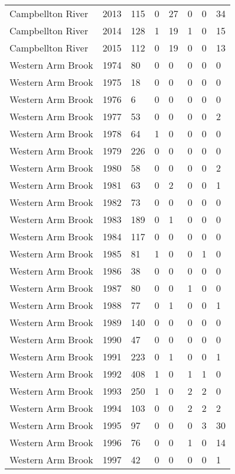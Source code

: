 \begin{longtable}{p{3cm}p{1cm}p{1.3cm}p{1.3cm}p{1.3cm}p{1.3cm}p{1.3cm}p{1.3cm}}
  Campbellton River & 2013 & 115 & 0 & 27 & 0 & 0 & 34 \\ 
  Campbellton River & 2014 & 128 & 1 & 19 & 1 & 0 & 15 \\ 
  Campbellton River & 2015 & 112 & 0 & 19 & 0 & 0 & 13 \\ 
  Western Arm Brook & 1974 & 80 & 0 & 0 & 0 & 0 & 0 \\ 
  Western Arm Brook & 1975 & 18 & 0 & 0 & 0 & 0 & 0 \\ 
  Western Arm Brook & 1976 & 6 & 0 & 0 & 0 & 0 & 0 \\ 
  Western Arm Brook & 1977 & 53 & 0 & 0 & 0 & 0 & 2 \\ 
  Western Arm Brook & 1978 & 64 & 1 & 0 & 0 & 0 & 0 \\ 
  Western Arm Brook & 1979 & 226 & 0 & 0 & 0 & 0 & 0 \\ 
  Western Arm Brook & 1980 & 58 & 0 & 0 & 0 & 0 & 2 \\ 
  Western Arm Brook & 1981 & 63 & 0 & 2 & 0 & 0 & 1 \\ 
  Western Arm Brook & 1982 & 73 & 0 & 0 & 0 & 0 & 0 \\ 
  Western Arm Brook & 1983 & 189 & 0 & 1 & 0 & 0 & 0 \\ 
  Western Arm Brook & 1984 & 117 & 0 & 0 & 0 & 0 & 0 \\ 
  Western Arm Brook & 1985 & 81 & 1 & 0 & 0 & 1 & 0 \\ 
  Western Arm Brook & 1986 & 38 & 0 & 0 & 0 & 0 & 0 \\ 
  Western Arm Brook & 1987 & 80 & 0 & 0 & 1 & 0 & 0 \\ 
  Western Arm Brook & 1988 & 77 & 0 & 1 & 0 & 0 & 1 \\ 
  Western Arm Brook & 1989 & 140 & 0 & 0 & 0 & 0 & 0 \\ 
  Western Arm Brook & 1990 & 47 & 0 & 0 & 0 & 0 & 0 \\ 
  Western Arm Brook & 1991 & 223 & 0 & 1 & 0 & 0 & 1 \\ 
  Western Arm Brook & 1992 & 408 & 1 & 0 & 1 & 1 & 0 \\ 
  Western Arm Brook & 1993 & 250 & 1 & 0 & 2 & 2 & 0 \\ 
  Western Arm Brook & 1994 & 103 & 0 & 0 & 2 & 2 & 2 \\ 
  Western Arm Brook & 1995 & 97 & 0 & 0 & 0 & 3 & 30 \\ 
  Western Arm Brook & 1996 & 76 & 0 & 0 & 1 & 0 & 14 \\ 
  Western Arm Brook & 1997 & 42 & 0 & 0 & 0 & 0 & 1 \\ 

\end{longtable}
